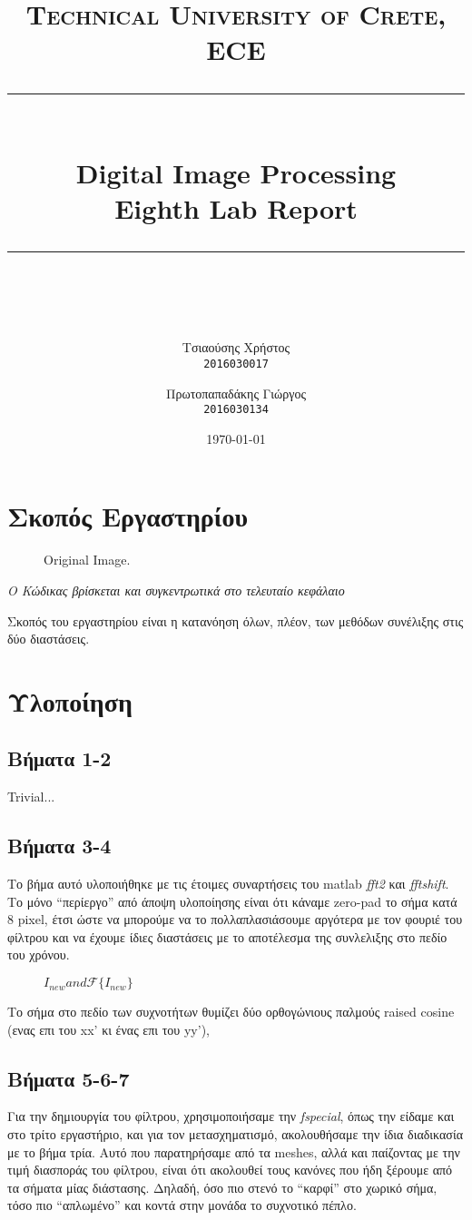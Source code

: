 \documentclass[11pt]{scrartcl} %
\title{
	\normalfont\normalsize
	\textsc{Technical University of Crete, ECE}\\ %
	\vspace{25pt} %
	\rule{\linewidth}{0.5pt}\\ %
	\vspace{20pt} %
	{\Huge Digital Image Processing}\\ %

	{\huge Eighth Lab Report}\\ %
	\vspace{12pt} %
	\rule{\linewidth}{2pt}\\ %
	\vspace{12pt} %
}
\author{\LARGE{Τσιαούσης Χρήστος}\\
		\texttt{2016030017}
		\and
		\LARGE{Πρωτοπαπαδάκης Γιώργος}\\
		\texttt{2016030134}}%
\date{\normalsize\today} %
\begin{document}
\maketitle %

\section{Σκοπός Εργαστηρίου}

\begin{figure}[h]
    \centering
    \caption{Original Image.}
\end{figure}

\textit{Ο Κώδικας βρίσκεται και συγκεντρωτικά στο τελευταίο κεφάλαιο}

\clearpage
Σκοπός του εργαστηρίου είναι η κατανόηση όλων, πλέον, των μεθόδων συνέλιξης
στις δύο διαστάσεις.

\section{Υλοποίηση}
\subsection*{Βήματα 1-2}
Trivial...

\subsection*{Βήματα 3-4}
Το βήμα αυτό υλοποιήθηκε με τις έτοιμες συναρτήσεις του matlab \textit{fft2} και \textit{fftshift}.
Το μόνο ``περίεργο'' από άποψη υλοποίησης είναι ότι κάναμε zero-pad το σήμα κατά 8 pixel, έτσι ώστε
να μπορούμε να το πολλαπλασιάσουμε αργότερα με τον φουριέ του φίλτρου και να έχουμε ίδιες διαστάσεις
με το αποτέλεσμα της συνλελιξης στο πεδίο του χρόνου.

\begin{figure}[h]
    \centering
    \caption{$I_{new} and \mathcal{F}\{I_{new}\}$}
\end{figure}

Το σήμα στο πεδίο των συχνοτήτων θυμίζει δύο ορθογώνιους παλμούς raised cosine (ενας επι του xx' κι ένας επι του yy'),


\subsection*{Βήματα 5-6-7}
Για την δημιουργία του φίλτρου, χρησιμοποιήσαμε την \textit{fspecial}, όπως την είδαμε και στο τρίτο εργαστήριο,
και για τον μετασχηματισμό, ακολουθήσαμε την ίδια διαδικασία με το βήμα τρία. Αυτό που παρατηρήσαμε από τα meshes,
αλλά και παίζοντας με την τιμή διασποράς του φίλτρου, είναι ότι ακολουθεί τους κανόνες που ήδη ξέρουμε από τα σήματα
μίας διάστασης. Δηλαδή, όσο πιο στενό το ``καρφί'' στο χωρικό σήμα, τόσο πιο ``απλωμένο'' και κοντά στην μονάδα το συχνοτικό
πέπλο.
\end{document}
